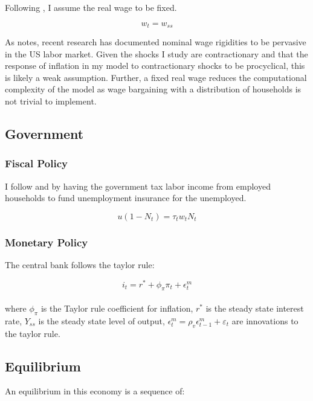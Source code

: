 \documentclass[titlepage]{\econtex}\providecommand{\texname}{Dissertation-Proposal}
\begin{document}
Following \cite{broer2021unemployment}, I assume the real wage to be fixed.

$$ w_{t} = w_{ss}$$

As \cite{broer2021unemployment} notes, recent research has documented nominal wage rigidities to be pervasive in the US labor market. Given the shocks I study are contractionary and that the response of inflation in my model to contractionary shocks to be procyclical, this is likely a weak assumption. Further, a fixed real wage reduces the computational complexity of the model as wage bargaining with a distribution of households is not trivial to implement. 


\hypertarget{Government}{}
\subsection{Government}

\hypertarget{Fiscal Policy}{}
\subsubsection{Fiscal Policy}

I follow \cite{Kekre2021} and \cite{challe2017precautionary} by having the government tax labor income from employed households to fund unemployment insurance for the unemployed.

$$ u(1 -N_{t}) = \tau_{t} w_{t}N_{t}$$

\hypertarget{Monetary Policy}{}
\subsubsection{Monetary Policy}


The central bank follows the taylor rule: 

$$i_{t} = r^{*} +\phi_{\pi} \pi_{t}  + \epsilon^{m}_{t}$$ \\

where $\phi_{\pi}$ is the Taylor rule coefficient for inflation,  $r^{*}$ is the steady state interest rate, $Y_{ss}$ is the steady state level of output,  $\epsilon^{m}_{t} = \rho_{v} \epsilon^{m}_{t-1} +\varepsilon_{t}$ are innovations to the taylor rule. \\

\hypertarget{Equilibrium}{}
\subsection{Equilibrium}


An equilibrium in this economy is a sequence of: \\
\end{document}
